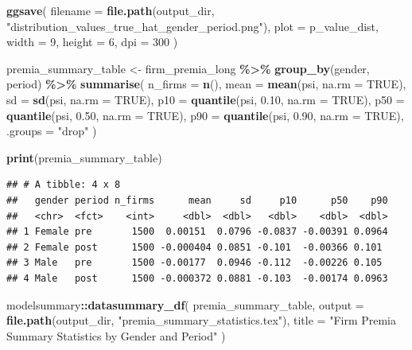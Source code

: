 \documentclass[
]{article}
\newenvironment{Shaded}{\begin{snugshade}}{\end{snugshade}}
\newcommand{\AttributeTok}[1]{\textcolor[rgb]{0.13,0.29,0.53}{#1}}
\newcommand{\ConstantTok}[1]{\textcolor[rgb]{0.56,0.35,0.01}{#1}}
\newcommand{\DecValTok}[1]{\textcolor[rgb]{0.00,0.00,0.81}{#1}}
\newcommand{\FloatTok}[1]{\textcolor[rgb]{0.00,0.00,0.81}{#1}}
\newcommand{\FunctionTok}[1]{\textcolor[rgb]{0.13,0.29,0.53}{\textbf{#1}}}
\newcommand{\NormalTok}[1]{#1}
\newcommand{\OtherTok}[1]{\textcolor[rgb]{0.56,0.35,0.01}{#1}}
\newcommand{\SpecialCharTok}[1]{\textcolor[rgb]{0.81,0.36,0.00}{\textbf{#1}}}
\newcommand{\StringTok}[1]{\textcolor[rgb]{0.31,0.60,0.02}{#1}}
\begin{document}
\begin{Shaded}
\begin{Highlighting}[]
\FunctionTok{ggsave}\NormalTok{(}
    \AttributeTok{filename =} \FunctionTok{file.path}\NormalTok{(output\_dir, }\StringTok{"distribution\_values\_true\_hat\_gender\_period.png"}\NormalTok{),}
    \AttributeTok{plot =}\NormalTok{ p\_value\_dist,}
    \AttributeTok{width =} \DecValTok{9}\NormalTok{,}
    \AttributeTok{height =} \DecValTok{6}\NormalTok{,}
    \AttributeTok{dpi =} \DecValTok{300}
\NormalTok{)}

\NormalTok{premia\_summary\_table }\OtherTok{\textless{}{-}}\NormalTok{ firm\_premia\_long }\SpecialCharTok{\%\textgreater{}\%}
    \FunctionTok{group\_by}\NormalTok{(gender, period) }\SpecialCharTok{\%\textgreater{}\%}
    \FunctionTok{summarise}\NormalTok{(}
        \AttributeTok{n\_firms =} \FunctionTok{n}\NormalTok{(),}
        \AttributeTok{mean =} \FunctionTok{mean}\NormalTok{(psi, }\AttributeTok{na.rm =} \ConstantTok{TRUE}\NormalTok{),}
        \AttributeTok{sd =} \FunctionTok{sd}\NormalTok{(psi, }\AttributeTok{na.rm =} \ConstantTok{TRUE}\NormalTok{),}
        \AttributeTok{p10 =} \FunctionTok{quantile}\NormalTok{(psi, }\FloatTok{0.10}\NormalTok{, }\AttributeTok{na.rm =} \ConstantTok{TRUE}\NormalTok{),}
        \AttributeTok{p50 =} \FunctionTok{quantile}\NormalTok{(psi, }\FloatTok{0.50}\NormalTok{, }\AttributeTok{na.rm =} \ConstantTok{TRUE}\NormalTok{),}
        \AttributeTok{p90 =} \FunctionTok{quantile}\NormalTok{(psi, }\FloatTok{0.90}\NormalTok{, }\AttributeTok{na.rm =} \ConstantTok{TRUE}\NormalTok{),}
        \AttributeTok{.groups =} \StringTok{"drop"}
\NormalTok{    )}

\FunctionTok{print}\NormalTok{(premia\_summary\_table)}
\end{Highlighting}
\end{Shaded}

\begin{verbatim}
## # A tibble: 4 x 8
##   gender period n_firms      mean     sd     p10      p50    p90
##   <chr>  <fct>    <int>     <dbl>  <dbl>   <dbl>    <dbl>  <dbl>
## 1 Female pre       1500  0.00151  0.0796 -0.0837 -0.00391 0.0964
## 2 Female post      1500 -0.000404 0.0851 -0.101  -0.00366 0.101 
## 3 Male   pre       1500 -0.00177  0.0946 -0.112  -0.00226 0.105 
## 4 Male   post      1500 -0.000372 0.0881 -0.103  -0.00174 0.0963
\end{verbatim}

\begin{Shaded}
\begin{Highlighting}[]
\NormalTok{modelsummary}\SpecialCharTok{::}\FunctionTok{datasummary\_df}\NormalTok{(}
\NormalTok{    premia\_summary\_table,}
    \AttributeTok{output =} \FunctionTok{file.path}\NormalTok{(output\_dir, }\StringTok{"premia\_summary\_statistics.tex"}\NormalTok{),}
    \AttributeTok{title =} \StringTok{"Firm Premia Summary Statistics by Gender and Period"}
\NormalTok{)}
\end{Highlighting}
\end{Shaded}
\end{document}

